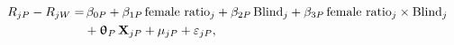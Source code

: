 \begin{equation}\label{equation3a}
	\begin{split}
		R_{jP}-R_{jW}=&\,\beta_{0P}+\beta_{1P}\,\text{female ratio}_j+\beta_{2P}\,\text{Blind}_j+\beta_{3P}\,\text{female ratio}_j\times\text{Blind}_j\\
			&+\bm\uptheta_P\,\mathbf{X}_{jP}+\mu_{jP}+\varepsilon_{jP},
	\end{split}
\end{equation}